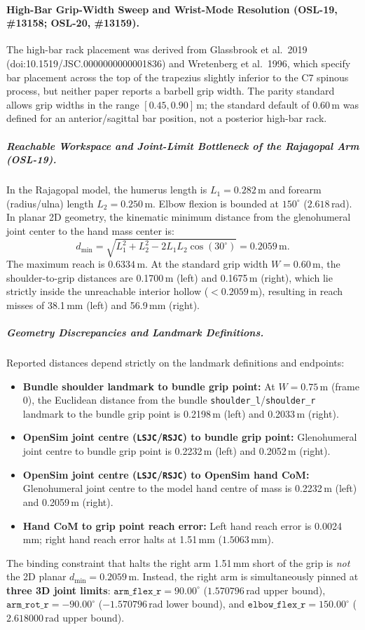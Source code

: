 \documentclass[11pt,a4paper]{article}
\begin{document}
\paragraph{High-Bar Grip-Width Sweep and Wrist-Mode Resolution (OSL-19, \#13158; OSL-20, \#13159).}
The high-bar rack placement was derived from Glassbrook et al.\ 2019 (doi:10.1519/JSC.0000000000001836)
and Wretenberg et al.\ 1996, which specify bar placement across the top of the trapezius slightly
inferior to the C7 spinous process, but neither paper reports a barbell grip width. The parity
standard allows grip widths in the range $[0.45, 0.90]$\,m; the standard default of 0.60\,m was
defined for an anterior/sagittal bar position, not a posterior high-bar rack.

\subparagraph{Reachable Workspace and Joint-Limit Bottleneck of the Rajagopal Arm (OSL-19).}
In the Rajagopal model, the humerus length is $L_1 = 0.282$\,m and forearm (radius/ulna) length
$L_2 = 0.250$\,m. Elbow flexion is bounded at $150^\circ$ ($2.618$\,rad). In planar 2D geometry,
the kinematic minimum distance from the glenohumeral joint center to the hand mass center is:
\begin{equation}
d_{\min} = \sqrt{L_1^2 + L_2^2 - 2 L_1 L_2 \cos(30^\circ)} = 0.2059\,\mathrm{m}.
\end{equation}
The maximum reach is $0.6334$\,m. At the standard grip width $W = 0.60$\,m, the shoulder-to-grip
distances are 0.1700\,m (left) and 0.1675\,m (right), which lie strictly inside the unreachable
interior hollow ($< 0.2059$\,m), resulting in reach misses of 38.1\,mm (left) and 56.9\,mm (right).

\subparagraph{Geometry Discrepancies and Landmark Definitions.}
Reported distances depend strictly on the landmark definitions and endpoints:
\begin{itemize}[noitemsep]
\item \textbf{Bundle shoulder landmark to bundle grip point:} At $W = 0.75$\,m (frame 0), the Euclidean
  distance from the bundle \texttt{shoulder\_l}/\texttt{shoulder\_r} landmark to the bundle grip point
  is 0.2198\,m (left) and 0.2033\,m (right).
\item \textbf{OpenSim joint centre (\texttt{LSJC}/\texttt{RSJC}) to bundle grip point:} Glenohumeral
  joint centre to bundle grip point is 0.2232\,m (left) and 0.2052\,m (right).
\item \textbf{OpenSim joint centre (\texttt{LSJC}/\texttt{RSJC}) to OpenSim hand CoM:} Glenohumeral
  joint centre to the model hand centre of mass is 0.2232\,m (left) and 0.2059\,m (right).
\item \textbf{Hand CoM to grip point reach error:} Left hand reach error is 0.0024\,mm; right hand
  reach error halts at 1.51\,mm ($1.5063$\,mm).
\end{itemize}
The binding constraint that halts the right arm 1.51\,mm short of the grip is \emph{not} the 2D planar
$d_{\min} = 0.2059$\,m. Instead, the right arm is simultaneously pinned at \textbf{three 3D joint limits}:
$\texttt{arm\_flex\_r} = 90.00^\circ$ ($1.570796$\,rad upper bound),
$\texttt{arm\_rot\_r} = -90.00^\circ$ ($-1.570796$\,rad lower bound), and
$\texttt{elbow\_flex\_r} = 150.00^\circ$ ($2.618000$\,rad upper bound).
\end{document}
